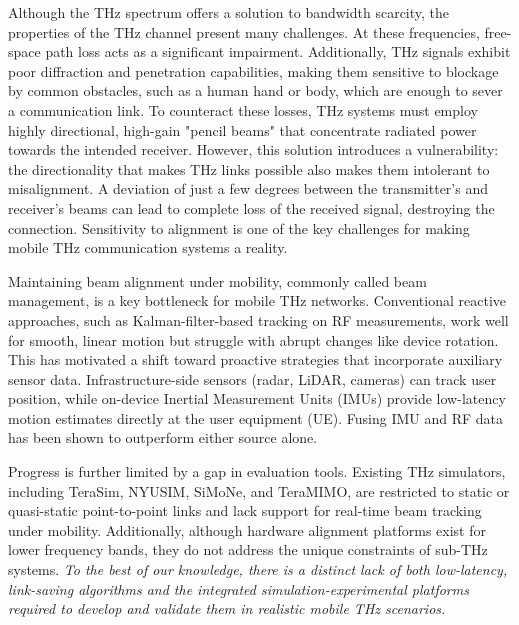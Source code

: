 \documentclass[fleqn,10pt]{wlscirep}
\begin{document}
Although the THz spectrum offers a solution to bandwidth scarcity, the properties of the THz channel present many challenges. At these frequencies, free-space path loss acts as a significant impairment\cite{10422992, Yu2025Research, Kleine-Ostmann2011}. Additionally, THz signals exhibit poor diffraction and penetration capabilities, making them sensitive to blockage by common obstacles, such as a human hand or body, which are enough to sever a communication link\cite{10494372, Jornet2023}. To counteract these losses, THz systems must employ highly directional, high-gain "pencil beams" that concentrate radiated power towards the intended receiver\cite{Kleine-Ostmann2011}. However, this solution introduces a vulnerability: the directionality that makes THz links possible also makes them intolerant to misalignment. A deviation of just a few degrees between the transmitter's and receiver's beams can lead to complete loss of the received signal, destroying the connection. Sensitivity to alignment is one of the key challenges for making mobile THz communication systems a reality\cite{10036372, Petrov2023Mobile, Azari2022}.

Maintaining beam alignment under mobility, commonly called beam management, is a key bottleneck for mobile THz networks\cite{Giordani2018ATO, 10422712, Wang2022}. Conventional reactive approaches, such as Kalman-filter-based tracking on RF measurements\cite{8455289,9145366,10067030, 10123123}, work well for smooth, linear motion but struggle with abrupt changes like device rotation\cite{Wang2022}. This has motivated a shift toward proactive strategies that incorporate auxiliary sensor data\cite{10494372, Azari2022, Nokia2022, Chen2023, Jornet2023}. Infrastructure-side sensors (radar, LiDAR, cameras) can track user position\cite{10422712,5GPPP_Automotive_Vision_2015}, while on-device Inertial Measurement Units (IMUs) provide low-latency motion estimates directly at the user equipment (UE). Fusing IMU and RF data has been shown to outperform either source alone\cite{10036372,9391649,electronics8020142, s21082723, 9814507}.

Progress is further limited by a gap in evaluation tools. Existing THz simulators, including TeraSim\cite{HOSSAIN2019100004}, NYUSIM\cite{10367974}, SiMoNe\cite{rose2015simone, eckhardt2022modular}, and TeraMIMO\cite{tarboush2021teramimo, bodet2023directional}, are restricted to static or quasi-static point-to-point links and lack support for real-time beam tracking under mobility\cite{Petrov2023Mobile}. Additionally, although hardware alignment platforms exist for lower frequency bands\cite{Abdulwahab2020, Keshavamurthy2022, AlAkkoumi2008}, they do not address the unique constraints of sub-THz systems. \emph{To the best of our knowledge, there is a distinct lack of both low-latency, link-saving algorithms and the integrated simulation-experimental platforms required to develop and validate them in realistic mobile THz scenarios.}
\end{document}
